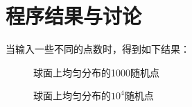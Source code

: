 \documentclass[a4paper,11pt]{article}
\begin{document}
\newpage
\section{程序结果与讨论}
当输入一些不同的点数时，得到如下结果：

\begin{figure}[!htbp]   
\centering     
{}
\caption{球面上均匀分布的1000随机点}      
\end{figure}

\begin{figure}[!htbp]   
\centering     
{}
\caption{球面上均匀分布的$10^{4}$随机点}      
\end{figure}
\end{document}
